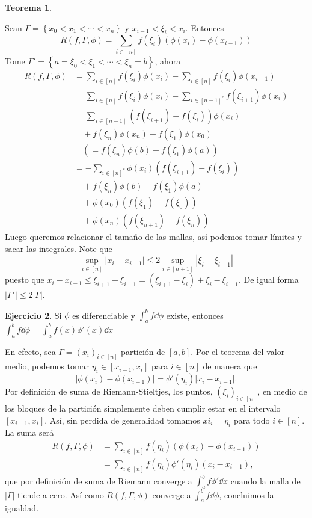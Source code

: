 \documentclass[12pt]{article}
\theoremstyle{plain}
\newtheorem{Th}{Teorema}[subsection]   %
\theoremstyle{definition}
\newtheorem{Ej}[Th]{Ejercicio}
\theoremstyle{remark}
\numberwithin{equation}{section}
\renewcommand{\leq}{\leqslant}      %
\renewcommand{\:}{\colon}           %
\newcommand{\conj}[1]{\left\lbrace#1\right\rbrace}
\newcommand{\bonj}[1]{\left\lbrack#1\right\rbrack}
\begin{document}
\begin{multicols}{2}
\begin{Th}
\end{Th}
\begin{ptcbp}
Sean $\Gamma=\conj{x_0<x_1<\cdots<x_n}$ y $x_{i-1}<\xi_i<x_i$. Entonces
$$R(f,\Gamma,\phi)=\sum_{i\in\bonj{n}}f(\xi_i)(\phi(x_i)-\phi(x_{i-1}))$$
Tome $\Gamma'=\conj{a=\xi_0<\xi_1<\cdots<\xi_n=b}$, ahora
\begin{align*}
  R(f,\Gamma,\phi) & =\sum_{i\in\bonj{n}}f(\xi_i)\phi(x_i)-\sum_{i\in\bonj{n}}f(\xi_i)\phi(x_{i-1})\\
  &=\sum_{i\in\bonj{n}}f(\xi_i)\phi(x_i)-\sum_{i\in\bonj{n-1}^*}f(\xi_{i+1})\phi(x_i)\\
  &=\sum_{i\in\bonj{n-1}}(f(\xi_{i+1})-f(\xi_{i}))\phi(x_i)\\
  &\quad +f(\xi_n)\phi(x_n)-f(\xi_1)\phi(x_0)\\
  &\quad\left(=f(\xi_n)\phi(b)-f(\xi_1)\phi(a)\right)\\
  &=-\sum_{i\in\bonj{n}^*}\phi(x_i)\left(f(\xi_{i+1})-f(\xi_i)\right)\\
  &\quad+f(\xi_n)\phi(b)-f(\xi_1)\phi(a)\\
  &\quad+\phi(x_0)(f(\xi_1)-f(\xi_0))\\
  &\quad+\phi(x_n)(f(\xi_{n+1})-f(\xi_n))
\end{align*}
Luego queremos relacionar el tamaño de las mallas, así podemos tomar límites y sacar las integrales. Note que
$$\sup_{i\in\bonj{n}}|x_i-x_{i-1}|\leq 2\sup_{i\in\bonj{n+1}}|\xi_i-\xi_{i-1}|$$
puesto que $x_i-x_{i-1}\leq\xi_{i+1}-\xi_{i-1}=(\xi_{i+1}-\xi_{i})+\xi_{i}-\xi_{i-1}$. De igual forma $|\Gamma'|\leq 2|\Gamma|$.
\end{ptcbp}

\begin{Ej}
  Si $\phi$ es diferenciable y $\int_{a}^{b}f\dd\phi$ existe, entonces $\int_{a}^{b}f\dd\phi=\int_{a}^{b}f(x)\phi'(x)\dd x$
  \end{Ej}

\begin{ptcb}
En efecto, sea $\Gamma=(x_i)_{i\in\bonj{n}}$ partición de $\bonj{a,b}$. Por el teorema del valor medio, podemos tomar $\eta_i\in\bonj{x_{i-1},x_i}$ para $i\in\bonj{n}$ de manera que
$$|\phi(x_i)-\phi(x_{i-1})|=\phi'(\eta_i)|x_i-x_{i-1}|.$$
Por definición de suma de Riemann-Stieltjes, los puntos, $(\xi_i)_{i\in\bonj{n}}$, en medio de los bloques de la partición simplemente deben cumplir estar en el intervalo $\bonj{x_{i-1},x_i}$. Así, sin perdida de generalidad tomamos $xi_i=\eta_i$ para todo $i\in\bonj{n}$. La suma será
\begin{align*}
  R(f,\Gamma,\phi) &=\sum_{i\in\bonj{n}}f(\eta_i)(\phi(x_i)-\phi(x_{i-1}))\\
  &=\sum_{i\in\bonj{n}}f(\eta_i)\phi'(\eta_i)(x_i-x_{i-1}),
\end{align*}
que por definición de suma de Riemann converge a $\int_{a}^{b}f\phi'\dd x$ cuando la malla de $|\Gamma|$ tiende a cero. Así como $R(f,\Gamma,\phi)$ converge a $\int_{a}^{b}f\dd\phi$, concluimos la igualdad.
\end{ptcb}


\end{multicols}
\end{document}
